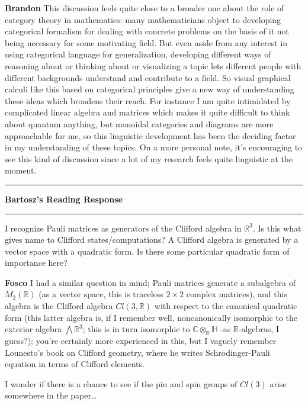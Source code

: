 \documentclass{amsart}
\newcommand{\iam}[1]{
  \vspace{0.25em}
  \hrule
  \vspace{0.25em}
  \textbf{{#1}'s Reading Response}
  \vspace{0.25em}
  \hrule
  \vspace{1em}
}
\newcommand{\respond}[1]{
  \vspace{1em} \textbf{#1}
}
\begin{document}
\respond{Brandon} This discussion feels quite close to a broader one about the role of category theory in mathematics: many mathematicians object to developing categorical formalism for dealing with concrete problems on the basis of it not being necessary for some motivating field.  But even aside from any interest in using categorical language for generalization, developing different ways of reasoning about or thinking about or visualizing a topic lets different people with different backgrounds understand and contribute to a field.  So visual graphical calculi like this based on categorical principles give a new way of understanding these ideas which broadens their reach.  For instance I am quite intimidated by complicated linear algebra and matrices which makes it quite difficult to think about quantum anything, but monoidal categories and diagrams are more approachable for me, so this linguistic development has been the deciding factor in my understanding of these topics.  On a more personal note, it's encouraging to see this kind of discussion since a lot of my research feels quite linguistic at the moment.

\iam{Bartosz}
I recognize Pauli matrices as generators of the Clifford algebra in $\mathbb{R}^3$. Is this what gives name to Clifford states/computations? A Clifford algebra is generated by a vector space with a quadratic form. Is there some particular quadratic form of importance here?

\respond{Fosco} I had a similar question in mind; Pauli matrices generate a subalgebra of $M_2(\mathbb R)$ (as a vector space, this is traceless $2\times 2$ complex matrices), and this algebra is the Clifford algebra $Cl(3,\mathbb R)$ with respect to the canonical quadratic form (this latter algebra is, if I remember well, noncanonically isomorphic to the exterior algebra $\bigwedge \mathbb R^3$; this is in turn isomorphic to $\mathbb C \otimes_{\mathbb R}\mathbb H$ -as $\mathbb R$-algebras, I guess?); you're certainly more experienced in this, but I vaguely remember Lounesto's book \cite{Lounesto} on Clifford geometry, where he writes Schrodinger-Pauli equation in terms of Clifford elements.

I wonder if there is a chance to see if the pin and spin groups of $Cl(3)$ arise somewhere in the paper\dots
\end{document}
